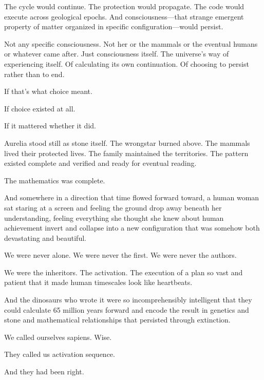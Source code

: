 The cycle would continue. The protection would propagate. The code would execute across geological epochs. And consciousness—that strange emergent property of matter organized in specific configuration—would persist.

Not any specific consciousness. Not her or the mammals or the eventual humans or whatever came after. Just consciousness itself. The universe's way of experiencing itself. Of calculating its own continuation. Of choosing to persist rather than to end.

If that's what choice meant.

If choice existed at all.

If it mattered whether it did.

Aurelia stood still as stone itself. The wrongstar burned above. The mammals lived their protected lives. The family maintained the territories. The pattern existed complete and verified and ready for eventual reading.

The mathematics was complete.

And somewhere in a direction that time flowed forward toward, a human woman sat staring at a screen and feeling the ground drop away beneath her understanding, feeling everything she thought she knew about human achievement invert and collapse into a new configuration that was somehow both devastating and beautiful.

We were never alone. We were never the first. We were never the authors.

We were the inheritors. The activation. The execution of a plan so vast and patient that it made human timescales look like heartbeats.

And the dinosaurs who wrote it were so incomprehensibly intelligent that they could calculate 65 million years forward and encode the result in genetics and stone and mathematical relationships that persisted through extinction.

We called ourselves sapiens. Wise.

They called us activation sequence.

And they had been right.

